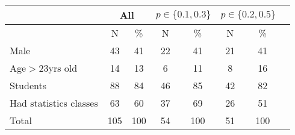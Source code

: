 \begin{tabular}{l*{7}{c}}
\hline\hline
 &  \multicolumn{2}{c}{All} & \multicolumn{2}{c}{$p\in\{0.1,0.3\}$} & \multicolumn{2}{c}{$p\in\{0.2,0.5\}$} \\
\hline
 & N & \%  & N & \%  & N & \%  \\
\hline
Male         &    43 & 41  &  22  &  41 & 21  & 41  \\

Age$>$23yrs old     &    14 & 13  &  6  & 11  &8   & 16  \\

Students     &    88 & 84  &  46  & 85  &  42 &  82 \\

Had statistics classes      &    63 & 60  & 37   & 69  & 26  &  51 \\

Total     &    105 & 100  & 54   & 100   &  51 &  100 \\
\hline
\hline
\end{tabular}

